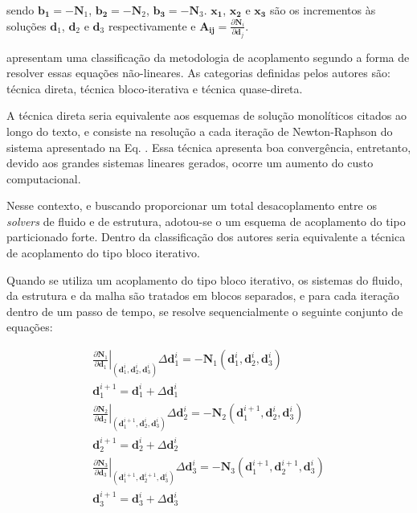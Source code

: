 \documentclass[tese_patricia]{subfiles}
\begin{document}
\noindent sendo $\mathbf{b_{1}} = - \mathbf{N}_{1}$, $\mathbf{b_{2}} = - \mathbf{N}_{2}$, $\mathbf{b_{3}} = - \mathbf{N}_{3}$. $\mathbf{x_{1}}$, $\mathbf{x_{2}}$ e $\mathbf{x_{3}}$ são os incrementos às soluções $\mathbf{d}_{1}$, $\mathbf{d}_{2}$ e $\mathbf{d}_{3}$ respectivamente e $\mathbf{A_{ij}} = \frac{\partial\mathbf{N}_{i}}{\partial\mathbf{d}_{j}}$. 

  apresentam uma classificação da metodologia de acoplamento segundo a forma de resolver essas equações não-lineares. As categorias definidas pelos autores são: técnica direta, técnica bloco-iterativa e técnica quase-direta. 

A técnica direta seria equivalente aos esquemas de solução monolíticos citados ao longo do texto, e consiste na resolução a cada iteração de Newton-Raphson do sistema apresentado na Eq. . Essa técnica apresenta boa convergência, entretanto, devido aos grandes sistemas lineares gerados, ocorre um aumento do custo computacional.

Nesse contexto, e buscando proporcionar um total desacoplamento entre os \textit{solvers} de fluido e de estrutura, adotou-se o um esquema de acoplamento do tipo particionado forte. Dentro da classificação dos autores  seria equivalente a técnica de acoplamento do tipo bloco iterativo.

Quando se utiliza um acoplamento do tipo bloco iterativo, os sistemas do fluido, da estrutura e da malha são tratados em blocos separados, e para cada iteração dentro de um passo de tempo, se resolve sequencialmente o seguinte conjunto de equações:


\begin{align}
	\left .\frac{\partial\mathbf{N}_{1}}{\partial\mathbf{d}_{1}}\right|_{\left(\mathbf{d}_{1}^{i},\mathbf{d}_{2}^{i},\mathbf{d}_{3}^{i}\right)} \Delta\mathbf{d}_{1}^{i} = - \mathbf{N}_{1}\left(\mathbf{d}_{1}^{i},\mathbf{d}_{2}^{i},\mathbf{d}_{3}^{i}\right)  \label{eq:Fluido} \\
	\mathbf{d}_{1}^{i+1} =  \mathbf{d}_{1}^{i} + \Delta\mathbf{d}_{1}^{i} \label{eq:upFluido}	\\
	\left.\frac{\partial\mathbf{N}_{2}}{\partial\mathbf{d}_{2}}\right|_{\left(\mathbf{d}_{1}^{i+1},\mathbf{d}_{2}^{i},\mathbf{d}_{3}^{i}\right)} \Delta\mathbf{d}_{2}^{i} = - \mathbf{N}_{2}\left(\mathbf{d}_{1}^{i+1},\mathbf{d}_{2}^{i},\mathbf{d}_{3}^{i}\right) \label{eq:Estrutura}\\
	\mathbf{d}_{2}^{i+1} =  \mathbf{d}_{2}^{i} + \Delta\mathbf{d}_{2}^{i} \label{eq:upEstrutura}\\
	\left.\frac{\partial\mathbf{N}_{3}}{\partial\mathbf{d}_{3}}\right|_{\left(\mathbf{d}_{1}^{i+1},\mathbf{d}_{2}^{i+1},\mathbf{d}_{3}^{i}\right)} \Delta\mathbf{d}_{3}^{i} = - \mathbf{N}_{3}\left(\mathbf{d}_{1}^{i+1},\mathbf{d}_{2}^{i+1},\mathbf{d}_{3}^{i}\right) \label{eq:Malha}\\
	\mathbf{d}_{3}^{i+1} =  \mathbf{d}_{3}^{i} + \Delta\mathbf{d}_{3}^{i}  \label{eq:upMalha}
\end{align}
\end{document}

